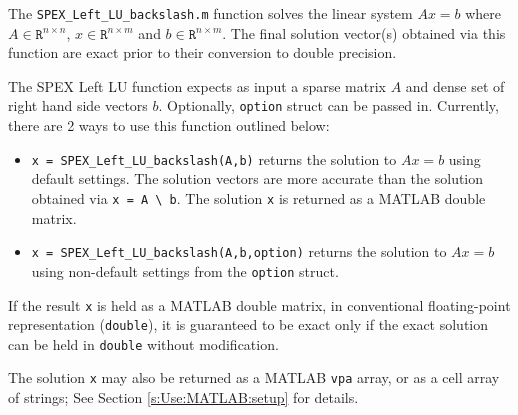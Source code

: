 \documentclass[12pt]{report}
\theoremstyle{definition}
\begin{document}
The \verb|SPEX_Left_LU_backslash.m| function solves the linear system $A x = b$ where
$A \in \mathtt{R}^{n \times n}$, $x \in \mathtt{R}^{n \times m}$ and $b \in
\mathtt{R}^{n \times m}$. The final solution vector(s) obtained via this
function are exact prior to their conversion to double precision.

The SPEX Left LU function expects as input a sparse matrix $A$ and dense set of
right hand side vectors $b$. Optionally, \verb|option| struct can be passed in.
Currently, there are 2 ways to use this function outlined below:

\begin{itemize}

\item \verb|x = SPEX_Left_LU_backslash(A,b)| returns the solution to $A x =
b$ using default settings. The solution vectors are more accurate than
the solution obtained via \verb|x = A \ b|.  The solution \verb|x| is
returned as a MATLAB double matrix.

\item \verb|x = SPEX_Left_LU_backslash(A,b,option)| returns the solution to $A x =
b$ using non-default settings from the \verb|option| struct.

\end{itemize}

If the result \verb|x| is held as a MATLAB double matrix, in conventional
floating-point representation (\verb|double|), it is guaranteed to be exact
only if the exact solution can be held in \verb|double| without modification.

The solution \verb|x| may also be returned as a MATLAB \verb|vpa| array, or as
a cell array of strings; See Section \ref{s:Use:MATLAB:setup} for details.




\end{document}
